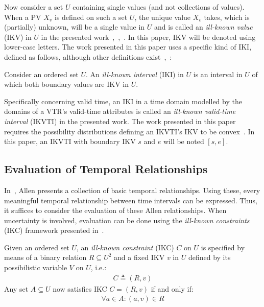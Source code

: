 \documentclass[runningheads,a4paper]{llncs}
\begin{document}
Now consider a set $U$ containing single values (and not collections of values). When a PV $X_{v}$ is defined on such a set $U$, the unique value $X_{v}$ takes, which is (partially) unknown, will be a single value in $U$ and is called an \emph{ill-known value} (IKV) in $U$ in the presented work~\cite{Dubois1988cma},~\cite{Pons2013ijufkbs},~\cite{Billiet2012ipmu}. In this paper, IKV will be denoted using lower-case letters. The work presented in this paper uses a specific kind of IKI, defined as follows, although other definitions exist~\cite{Pons2012ipmu},~\cite{Billiet2012ipmu}:

\begin{definition}
Consider an ordered set $U$. An \emph{ill-known interval} (IKI) in $U$ is an interval in $U$ of which both boundary values are IKV in $U$.
\end{definition}

Specifically concerning valid time, an IKI in a time domain modelled by the domains of a VTR's valid-time attributes is called an \emph{ill-known valid-time interval} (IKVTI) in the presented work. The work presented in this paper requires the possibility distributions defining an IKVTI's IKV to be convex~\cite{Pons2013ijufkbs}. In this paper, an IKVTI with boundary IKV $s$ and $e$ will be noted $\left[s, e\right]$.

\subsection{Evaluation of Temporal Relationships}
In~\cite{Allen1983cacm}, Allen presents a collection of basic temporal relationships. Using these, every meaningful temporal relationship between time intervals can be expressed. Thus, it suffices to consider the evaluation of these Allen relationships. When uncertainty is involved, evaluation can be done using the \emph{ill-known constraints} (IKC) framework presented in~\cite{Pons2013ijufkbs}.

\begin{definition}
Given an ordered set $U$, an \emph{ill-known constraint} (IKC) $C$ on $U$ is specified by means of a binary relation $R \subseteq U^{2}$ and a fixed IKV $v$ in $U$ defined by its possibilistic variable $V$ on $U$, i.e.:
\begin{align}
C \triangleq (R,v) \nonumber
\end{align}
Any set $A \subseteq U$ now satisfies IKC $C = (R,v)$ if and only if:
\begin{align}
\forall a \in A : (a,v) \in R \nonumber
\end{align}
\end{definition}
\end{document}
